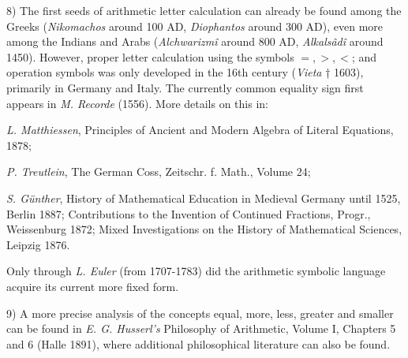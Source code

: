 \vfill
\leftline{\rule{2in}{0.4pt}}
\vspace{0.2cm}
{
\footnotesize
8) The first seeds of arithmetic letter calculation can already be found among the Greeks (\textit{Nikomachos} around 100 AD, \textit{Diophantos} around 300 AD), even more among the Indians and Arabs (\textit{Alchwarizmî} around 800 AD, \textit{Alkalsâdî} around 1450). However, proper letter calculation using the symbols $=, >, <$; and operation symbols was only developed in the 16th century (\textit{Vieta} † 1603), primarily in Germany and Italy. The currently common equality sign first appears in \textit{M. Recorde} (1556). More details on this in:

\textit{L. Matthiessen}, Principles of Ancient and Modern Algebra of Literal Equations, 1878; 

\textit{P. Treutlein}, The German Coss, Zeitschr. f. Math., Volume 24; 

\textit{S. Günther}, History of Mathematical Education in Medieval Germany until 1525, Berlin 1887; Contributions to the Invention of Continued Fractions, Progr., Weissenburg 1872; Mixed Investigations on the History of Mathematical Sciences, Leipzig 1876. 

Only through \textit{L. Euler} (from 1707-1783) did the arithmetic symbolic language acquire its current more fixed form.

9) A more precise analysis of the concepts equal, more, less, greater and smaller can be found in \textit{E. G. Husserl's} Philosophy of Arithmetic, Volume I, Chapters 5 and 6 (Halle 1891), where additional philosophical literature can also be found.

}
